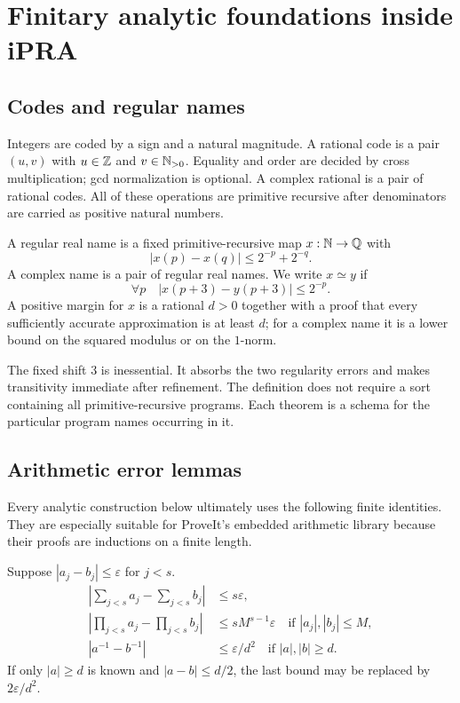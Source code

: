 \section{Finitary analytic foundations inside iPRA}
\label{sec:foundations}

\subsection{Codes and regular names}

Integers are coded by a sign and a natural magnitude.  A rational code is a pair $(u,v)$ with $u\in\mathbb Z$ and $v\in\mathbb N_{>0}$.  Equality and order are decided by cross multiplication; gcd normalization is optional.  A complex rational is a pair of rational codes.  All of these operations are primitive recursive after denominators are carried as positive natural numbers.

\begin{definition}
A regular real name is a fixed primitive-recursive map $x:\mathbb N\to\mathbb Q$ with
\[
 |x(p)-x(q)|\le 2^{-p}+2^{-q}.
\]
A complex name is a pair of regular real names.  We write $x\simeq y$ if
\[
 \forall p\quad |x(p+3)-y(p+3)|\le 2^{-p}.
\]
A positive margin for $x$ is a rational $d>0$ together with a proof that every sufficiently accurate approximation is at least $d$; for a complex name it is a lower bound on the squared modulus or on the $1$-norm.
\end{definition}

The fixed shift $3$ is inessential.  It absorbs the two regularity errors and makes transitivity immediate after refinement.  The definition does not require a sort containing all primitive-recursive programs.  Each theorem is a schema for the particular program names occurring in it.

\subsection{Arithmetic error lemmas}

Every analytic construction below ultimately uses the following finite identities.  They are especially suitable for ProveIt's embedded arithmetic library because their proofs are inductions on a finite length.

\begin{lemma}
Suppose $|a_j-b_j|\le\varepsilon$ for $j<s$.
\begin{align*}
 \left|\sum_{j<s}a_j-\sum_{j<s}b_j\right|&\le s\varepsilon,\\
 \left|\prod_{j<s}a_j-\prod_{j<s}b_j\right|&\le sM^{s-1}\varepsilon
 \quad\text{if }|a_j|,|b_j|\le M,\\
 |a^{-1}-b^{-1}|&\le \varepsilon/d^2
 \quad\text{if } |a|,|b|\ge d.
\end{align*}
If only $|a|\ge d$ is known and $|a-b|\le d/2$, the last bound may be replaced by $2\varepsilon/d^2$.
\end{lemma}

